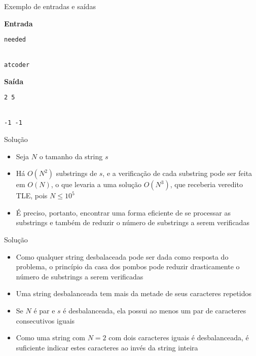 \begin{frame}[fragile]{Exemplo de entradas e saídas}

\begin{minipage}[t]{0.55\textwidth}
\textbf{Entrada}
\begin{verbatim}
needed


atcoder
\end{verbatim}
\end{minipage}
\begin{minipage}[t]{0.4\textwidth}
\textbf{Saída}
\begin{verbatim}
2 5


-1 -1
\end{verbatim}
\end{minipage}
\end{frame}

\begin{frame}[fragile]{Solução}

    \begin{itemize}
        \item Seja $N$ o tamanho da string $s$

        \item Há $O(N^2)$ substrings de $s$, e a verificação de cada substring pode ser feita em
            $O(N)$, o que levaria a uma solução $O(N^3)$, que receberia veredito TLE, pois
            $N \leq 10^5$

        \item É preciso, portanto, encontrar uma forma eficiente de se processar as substrings
            e também de reduzir o número de substrings a serem verificadas
    \end{itemize}

\end{frame}


\begin{frame}[fragile]{Solução}

    \begin{itemize}
        \item Como qualquer string desbalaceada pode ser dada como resposta do problema, o 
            princípio da casa dos pombos pode reduzir drasticamente o número de substrings a
            serem verificadas

        \item Uma string desbalanceada tem mais da metade de seus caracteres repetidos

        \item Se $N$ é par e $s$ é desbalanceada, ela possui ao menos um par de caracteres 
            consecutivos iguais

        \item Como uma string com $N = 2$ com dois caracteres iguais é desbalanceada, é suficiente
            indicar estes caracteres ao invés da string inteira
    \end{itemize}

\end{frame}

